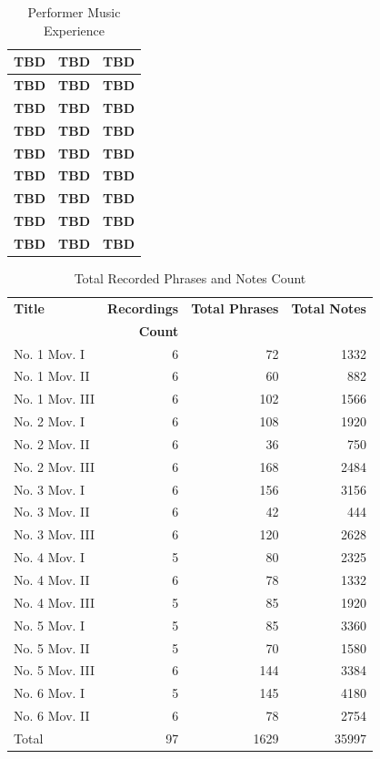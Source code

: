 \begin{table}[bp]
   \centering
   \caption{Performer Music Experience}
   \label{tab:performer}
   \begin{tabular}{lrr}
      \hline
      \textbf{TBD} & \textbf{TBD} & \textbf{TBD}\\
      \hline
      \textbf{TBD} & \textbf{TBD} & \textbf{TBD}\\
      \hline
      \textbf{TBD} & \textbf{TBD} & \textbf{TBD}\\
      \hline
      \textbf{TBD} & \textbf{TBD} & \textbf{TBD}\\
      \hline
      \textbf{TBD} & \textbf{TBD} & \textbf{TBD}\\
      \hline
      \textbf{TBD} & \textbf{TBD} & \textbf{TBD}\\
      \hline
      \textbf{TBD} & \textbf{TBD} & \textbf{TBD}\\
      \hline
      \textbf{TBD} & \textbf{TBD} & \textbf{TBD}\\
      \hline
      \textbf{TBD} & \textbf{TBD} & \textbf{TBD}\\
      \hline
   \end{tabular}
\end{table}
\begin{table}[bp]
   \centering
   \caption{Total Recorded Phrases and Notes Count}
   \label{tab:corpuscount}
   \begin{tabular}{lrrr}
      \hline
      \bf Title&\bf Recordings&\bf Total Phrases&\bf Total Notes\\
      &\bf Count&&\\
      \hline
      No. 1 Mov. I&6&72&1332\\
      No. 1 Mov. II&6&60&882\\
      No. 1 Mov. III&6&102&1566\\
      No. 2 Mov. I&6&108&1920\\
      No. 2 Mov. II&6&36&750\\
      No. 2 Mov. III&6&168&2484\\
      No. 3 Mov. I&6&156&3156\\
      No. 3 Mov. II&6&42&444\\
      No. 3 Mov. III&6&120&2628\\
      No. 4 Mov. I&5&80&2325\\
      No. 4 Mov. II&6&78&1332\\
      No. 4 Mov. III&5&85&1920\\
      No. 5 Mov. I&5&85&3360\\
      No. 5 Mov. II&5&70&1580\\
      No. 5 Mov. III&6&144&3384\\
      No. 6 Mov. I&5&145&4180\\
      No. 6 Mov. II&6&78&2754\\
      \hline
      Total&97&1629&35997\\
      \hline
   \end{tabular}
\end{table}


